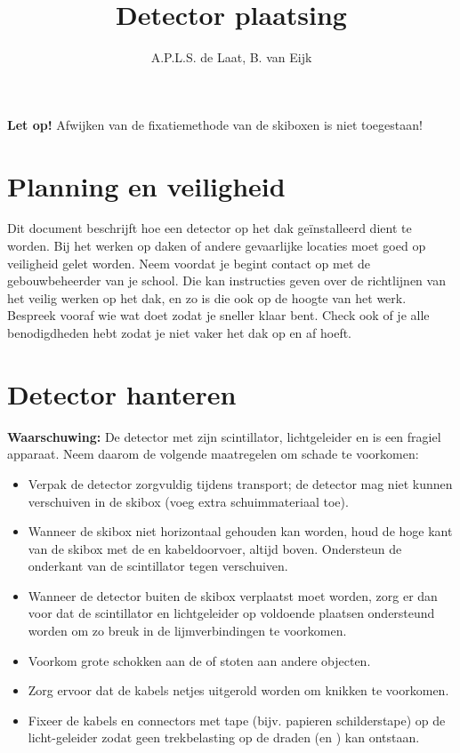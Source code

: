 

\title{Detector plaatsing}
\author{A.P.L.S. de Laat, B. van Eijk}



\maketitle

\textbf{Let op!} Afwijken van de fixatiemethode van de skiboxen is niet
toegestaan!


\section{Planning en veiligheid}

Dit document beschrijft hoe een \hisparc detector op het dak
geïnstalleerd dient te worden. Bij het werken op daken of andere
gevaarlijke locaties moet goed op veiligheid gelet worden. Neem voordat
je begint contact op met de gebouwbeheerder van je school. Die kan
instructies geven over de richtlijnen van het veilig werken op het dak,
en zo is die ook op de hoogte van het werk. Bespreek vooraf wie wat doet
zodat je sneller klaar bent. Check ook of je alle benodigdheden hebt
zodat je niet vaker het dak op en af hoeft.


\section{Detector hanteren}

\textbf{Waarschuwing:} De \hisparc detector met zijn scintillator,
lichtgeleider en \pmt is een fragiel apparaat. Neem daarom de volgende
maatregelen om schade te voorkomen:

\begin{itemize}
    \item Verpak de detector zorgvuldig tijdens transport; de detector
    mag niet kunnen verschuiven in de skibox (voeg extra schuimmateriaal
    toe).
    \item Wanneer de skibox niet horizontaal gehouden kan worden, houd
    de hoge kant van de skibox met de \pmt en kabeldoorvoer, altijd
    boven. Ondersteun de onderkant van de scintillator tegen verschuiven.
    \item Wanneer de detector buiten de skibox verplaatst moet worden,
    zorg er dan voor dat de scintillator en lichtgeleider op voldoende
    plaatsen ondersteund worden om zo breuk in de lijmverbindingen te
    voorkomen.
    \item Voorkom grote schokken aan de \pmt of stoten aan andere
    objecten.
    \item Zorg ervoor dat de kabels netjes uitgerold worden om knikken
    te voorkomen.
    \item Fixeer de \pmt kabels en connectors met tape (bijv. papieren
    schilderstape) op de licht-geleider zodat geen trekbelasting op de
    draden (en \pmt) kan ontstaan.
\end{itemize}

